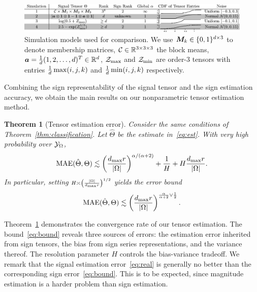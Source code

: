 \documentclass{article}
\theoremstyle{plain}
\newtheorem{thm}{Theorem}
\theoremstyle{definition}
\begin{document}
\begin{figure}[h]
\includegraphics[width=1\textwidth]{figure/simulation_new.pdf}
\vspace{-.8cm}
\caption{Simulation models used for comparison. We use $\bm M_k\in\{0,1\}^{d\times 3}$ to denote membership matrices, $\mathcal{C}\in\mathbb{R}^{3\times 3\times 3}$ the block means, $\bm{a}={1\over d}(1,2,\ldots,d)^T \in\mathbb{R}^d$, $\mathcal{Z}_{\max}$ and $\mathcal{Z}_{\min}$ are order-3 tensors with entries ${1\over d}\max(i,j,k)$ and ${1\over d}\min(i,j,k)$ respectively.}\label{tab:simulation}
\vspace{-.4cm}
\end{figure}


Combining the sign representability of the signal tensor and the sign estimation accuracy, we obtain the main results on our nonparametric tensor estimation method.
\begin{thm}[Tensor estimation error]\label{thm:estimation} Consider the same conditions of Theorem~\ref{thm:classification}. Let $\hat \Theta$ be the estimate in~\eqref{eq:est}. With very high probability over $\mathcal{Y}_\Omega$,
\begin{equation}\label{eq:bound}
\textup{MAE}(\hat \Theta, \Theta)\lesssim \left({d_{\max} r \over |\Omega|}\right)^{\alpha/(\alpha+2)}+{1\over H}+H{d_{\max} r \over |\Omega|}.
\end{equation}
In particular, setting $\scriptstyle H\asymp \left( |\Omega|\over d_{\max}r\right)^{1/2}$ yields the error bound
\begin{equation}\label{eq:real}
\textup{MAE}(\hat \Theta, \Theta)\lesssim \left(d_{\max}r \over|\Omega|\right)^{{\alpha \over \alpha+2} \vee {1\over 2}}.
\end{equation}
\end{thm}
Theorem~\ref{thm:estimation} demonstrates the convergence rate of our tensor estimation. The bound~\eqref{eq:bound} reveals three sources of errors: the estimation error inherited from sign tensors, the bias from sign series representations, and the variance thereof. The resolution parameter $H$ controls the bias-variance tradeoff. We remark that the signal estimation error~\eqref{eq:real} is generally no better than the corresponding sign error~\eqref{eq:bound}. This is to be expected, since magnitude estimation is a harder problem than sign estimation. 
\end{document}
